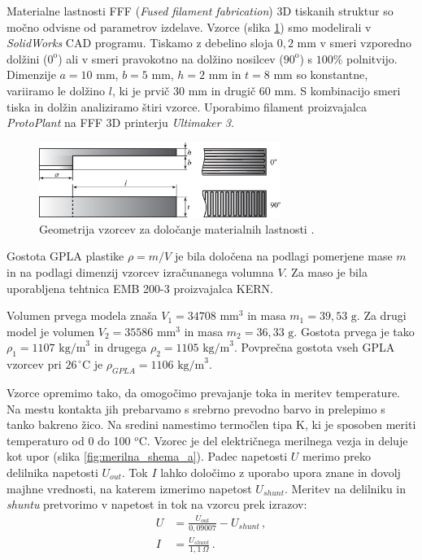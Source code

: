         Materialne lastnosti FFF (\textit{Fused filament fabrication}) 3D tiskanih struktur so močno odvisne od parametrov izdelave. Vzorce (slika \ref{fig:vzorci}) smo modelirali v \textit{SolidWorks} CAD programu. Tiskamo z debelino sloja $0,2 \text{ mm}$ v smeri vzporedno dolžini ($0^\text{o}$) ali v smeri pravokotno na dolžino nosilcev ($90^\text{o}$) s $100\%$ polnitvijo. Dimenzije $a = 10\text{ mm}$, $b=5\text{ mm}$, $h=2\text{ mm}$ in $t=8\text{ mm}$ so konstantne, variiramo le dolžino $l$, ki je prvič $30 \text{ mm}$ in drugič $60\text{ mm}$. S kombinacijo smeri tiska in dolžin analiziramo štiri vzorce. Uporabimo filament proizvajalca \textit{ProtoPlant} na FFF 3D printerju \textit{Ultimaker 3}.
        \begin{figure}[!hb]
            \centering
            \includegraphics[width=0.70\textwidth]{slike/metodologija/vzorci.eps}
            \caption{Geometrija vzorcev za določanje materialnih lastnosti \cite{Bizjan_2021}.}\label{fig:vzorci}
        \end{figure}

            Gostota GPLA plastike $\rho=m/V$ je bila določena na podlagi pomerjene mase $m$ in na podlagi dimenzij vzorcev izračunanega volumna $V$. Za maso je bila uporabljena tehtnica EMB 200-3 proizvajalca KERN.
            
            Volumen prvega modela znaša $V_1=34708 \text{ mm}^3$ in masa $m_1=39,53 \text{ g}$. Za drugi model je volumen $V_2=35586 \text{ mm}^3$ in masa $m_2=36,33 \text{ g}$. Gostota prvega je tako $\rho_1=1107 \text{ kg/m}^3$ in drugega $\rho_2=1105 \text{ kg/m}^3$. Povprečna gostota vseh GPLA vzorcev pri $26^{\,\circ}$C je $\rho_{GPLA}=1106 \text{ kg/m}^3$.

            Vzorce opremimo tako, da omogočimo prevajanje toka in meritev temperature. Na mestu kontakta jih prebarvamo s srebrno prevodno barvo in prelepimo s tanko bakreno žico. Na sredini namestimo termočlen tipa K, ki je sposoben meriti temperaturo od 0 do 100 $^o$C. Vzorec je del električnega merilnega vezja in deluje kot upor (slika \ref{fig:merilna_shema_a}). Padec napetosti $U$ merimo preko delilnika napetosti $U_{out}$. Tok $I$ lahko določimo z uporabo upora znane in dovolj majhne vrednosti, na katerem izmerimo napetost $U_{shunt}$. Meritev na delilniku in \textit{shuntu} pretvorimo v napetost in tok na vzorcu prek izrazov:
            \begin{align}
                U &= \frac{U_{out}}{0,09007}-U_{shunt} \,, \\
                I&=\frac{U_{shunt}}{1,1 \, \Omega} \, .
            \end{align}
            
